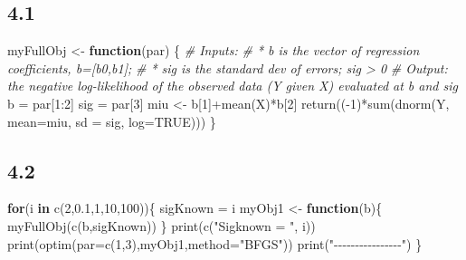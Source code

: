 \documentclass[
  11pt,
]{article}
\newenvironment{Shaded}{\begin{snugshade}}{\end{snugshade}}
\newcommand{\AttributeTok}[1]{\textcolor[rgb]{0.77,0.63,0.00}{#1}}
\newcommand{\CommentTok}[1]{\textcolor[rgb]{0.56,0.35,0.01}{\textit{#1}}}
\newcommand{\ConstantTok}[1]{\textcolor[rgb]{0.00,0.00,0.00}{#1}}
\newcommand{\ControlFlowTok}[1]{\textcolor[rgb]{0.13,0.29,0.53}{\textbf{#1}}}
\newcommand{\DecValTok}[1]{\textcolor[rgb]{0.00,0.00,0.81}{#1}}
\newcommand{\FloatTok}[1]{\textcolor[rgb]{0.00,0.00,0.81}{#1}}
\newcommand{\FunctionTok}[1]{\textcolor[rgb]{0.00,0.00,0.00}{#1}}
\newcommand{\NormalTok}[1]{#1}
\newcommand{\OtherTok}[1]{\textcolor[rgb]{0.56,0.35,0.01}{#1}}
\newcommand{\SpecialCharTok}[1]{\textcolor[rgb]{0.00,0.00,0.00}{#1}}
\newcommand{\StringTok}[1]{\textcolor[rgb]{0.31,0.60,0.02}{#1}}
\begin{document}
\hypertarget{section-3}{%
\subsection{4.1}\label{section-3}}

\begin{Shaded}
\begin{Highlighting}[]
\NormalTok{myFullObj }\OtherTok{\textless{}{-}} \ControlFlowTok{function}\NormalTok{(par) \{}
\CommentTok{\# Inputs:}
\CommentTok{\# * b is the vector of regression coefficients, b=[b0,b1];}
\CommentTok{\# * sig is the standard dev of errors; sig \textgreater{} 0}
\CommentTok{\# Output: the negative log{-}likelihood of the observed data (Y given X) evaluated at b and sig}
\NormalTok{  b }\OtherTok{=}\NormalTok{ par[}\DecValTok{1}\SpecialCharTok{:}\DecValTok{2}\NormalTok{]}
\NormalTok{  sig }\OtherTok{=}\NormalTok{ par[}\DecValTok{3}\NormalTok{]}
\NormalTok{  miu }\OtherTok{\textless{}{-}}\NormalTok{ b[}\DecValTok{1}\NormalTok{]}\SpecialCharTok{+}\FunctionTok{mean}\NormalTok{(X)}\SpecialCharTok{*}\NormalTok{b[}\DecValTok{2}\NormalTok{]}
  \FunctionTok{return}\NormalTok{((}\SpecialCharTok{{-}}\DecValTok{1}\NormalTok{)}\SpecialCharTok{*}\FunctionTok{sum}\NormalTok{(}\FunctionTok{dnorm}\NormalTok{(Y, }\AttributeTok{mean=}\NormalTok{miu, }\AttributeTok{sd =}\NormalTok{ sig, }\AttributeTok{log=}\ConstantTok{TRUE}\NormalTok{)))}
\NormalTok{\}}
\end{Highlighting}
\end{Shaded}

\hypertarget{section-4}{%
\subsection{4.2}\label{section-4}}

\begin{Shaded}
\begin{Highlighting}[]
\ControlFlowTok{for}\NormalTok{(i }\ControlFlowTok{in} \FunctionTok{c}\NormalTok{(}\DecValTok{2}\NormalTok{,}\FloatTok{0.1}\NormalTok{,}\DecValTok{1}\NormalTok{,}\DecValTok{10}\NormalTok{,}\DecValTok{100}\NormalTok{))\{}
\NormalTok{  sigKnown }\OtherTok{=}\NormalTok{ i}
\NormalTok{  myObj1 }\OtherTok{\textless{}{-}} \ControlFlowTok{function}\NormalTok{(b)\{}
    \FunctionTok{myFullObj}\NormalTok{(}\FunctionTok{c}\NormalTok{(b,sigKnown))}
\NormalTok{  \}}
  \FunctionTok{print}\NormalTok{(}\FunctionTok{c}\NormalTok{(}\StringTok{"Sigknown = "}\NormalTok{, i))}
  \FunctionTok{print}\NormalTok{(}\FunctionTok{optim}\NormalTok{(}\AttributeTok{par=}\FunctionTok{c}\NormalTok{(}\DecValTok{1}\NormalTok{,}\DecValTok{3}\NormalTok{),myObj1,}\AttributeTok{method=}\StringTok{"BFGS"}\NormalTok{))}
  \FunctionTok{print}\NormalTok{(}\StringTok{"{-}{-}{-}{-}{-}{-}{-}{-}{-}{-}{-}{-}{-}{-}{-}{-}"}\NormalTok{)}
\NormalTok{\}}
\end{Highlighting}
\end{Shaded}
\end{document}
